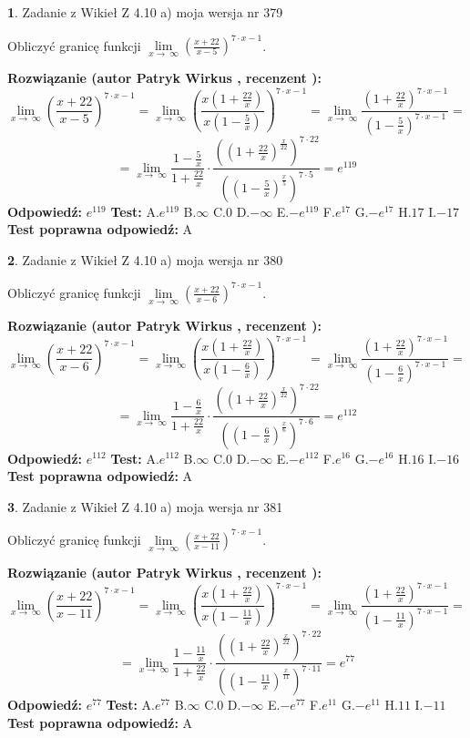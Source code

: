 \documentclass[12pt, a4paper]{article}
\theoremstyle{definition} %
\newtheorem{zad}{}
\newcommand{\zadStart}[1]{\begin{zad}#1\newline}
\newcommand{\zadStop}{\end{zad}}
\newcommand{\rozwStart}[2]{\noindent \textbf{Rozwiązanie (autor #1 , recenzent #2): }\newline}
\newcommand{\rozwStop}{\newline}
\newcommand{\odpStart}{\noindent \textbf{Odpowiedź:}\newline}
\newcommand{\odpStop}{\newline}
\newcommand{\testStart}{\noindent \textbf{Test:}\newline}
\newcommand{\testStop}{\newline}
\newcommand{\kluczStart}{\noindent \textbf{Test poprawna odpowiedź:}\newline}
\newcommand{\kluczStop}{\newline}
\begin{document}
\zadStart{Zadanie z Wikieł Z 4.10 a) moja wersja nr 379}

Obliczyć granicę funkcji  $\lim\limits_{x\to\ \infty}(\frac{x+22}{x-5})^{7\cdot x-1}$.
\zadStop
\rozwStart{Patryk Wirkus}{}
$$\lim\limits_{x\to\ \infty}(\frac{x+22}{x-5})^{7\cdot x-1} = \lim\limits_{x\to\ \infty}(\frac{x(1+\frac{22}{x})}{x(1-\frac{5}{x})})^{7\cdot x-1}=\lim\limits_{x\to\ \infty}\frac{(1+\frac{22}{x})^{7\cdot x-1}}{(1-\frac{5}{x})^{7\cdot x-1}}=$$
$$=\lim\limits_{x\to\ \infty}\frac{1-\frac{5}{x}}{1+\frac{22}{x}}\cdot\frac{((1+\frac{22}{x})^{\frac{x}{22}})^{7\cdot22}}{((1-\frac{5}{x})^{\frac{x}{5}})^{7\cdot5}}=e^{119}$$
\rozwStop
\odpStart
$e^{119}$
\odpStop
\testStart
A.$e^{119}$ B.$\infty$ C.$0$ D.$-\infty$ E.$-e^{119}$
F.$e^{17}$ G.$-e^{17}$
H.$17$
I.$-17$
\testStop
\kluczStart
A
\kluczStop



\zadStart{Zadanie z Wikieł Z 4.10 a) moja wersja nr 380}

Obliczyć granicę funkcji  $\lim\limits_{x\to\ \infty}(\frac{x+22}{x-6})^{7\cdot x-1}$.
\zadStop
\rozwStart{Patryk Wirkus}{}
$$\lim\limits_{x\to\ \infty}(\frac{x+22}{x-6})^{7\cdot x-1} = \lim\limits_{x\to\ \infty}(\frac{x(1+\frac{22}{x})}{x(1-\frac{6}{x})})^{7\cdot x-1}=\lim\limits_{x\to\ \infty}\frac{(1+\frac{22}{x})^{7\cdot x-1}}{(1-\frac{6}{x})^{7\cdot x-1}}=$$
$$=\lim\limits_{x\to\ \infty}\frac{1-\frac{6}{x}}{1+\frac{22}{x}}\cdot\frac{((1+\frac{22}{x})^{\frac{x}{22}})^{7\cdot22}}{((1-\frac{6}{x})^{\frac{x}{6}})^{7\cdot6}}=e^{112}$$
\rozwStop
\odpStart
$e^{112}$
\odpStop
\testStart
A.$e^{112}$ B.$\infty$ C.$0$ D.$-\infty$ E.$-e^{112}$
F.$e^{16}$ G.$-e^{16}$
H.$16$
I.$-16$
\testStop
\kluczStart
A
\kluczStop



\zadStart{Zadanie z Wikieł Z 4.10 a) moja wersja nr 381}

Obliczyć granicę funkcji  $\lim\limits_{x\to\ \infty}(\frac{x+22}{x-11})^{7\cdot x-1}$.
\zadStop
\rozwStart{Patryk Wirkus}{}
$$\lim\limits_{x\to\ \infty}(\frac{x+22}{x-11})^{7\cdot x-1} = \lim\limits_{x\to\ \infty}(\frac{x(1+\frac{22}{x})}{x(1-\frac{11}{x})})^{7\cdot x-1}=\lim\limits_{x\to\ \infty}\frac{(1+\frac{22}{x})^{7\cdot x-1}}{(1-\frac{11}{x})^{7\cdot x-1}}=$$
$$=\lim\limits_{x\to\ \infty}\frac{1-\frac{11}{x}}{1+\frac{22}{x}}\cdot\frac{((1+\frac{22}{x})^{\frac{x}{22}})^{7\cdot22}}{((1-\frac{11}{x})^{\frac{x}{11}})^{7\cdot11}}=e^{77}$$
\rozwStop
\odpStart
$e^{77}$
\odpStop
\testStart
A.$e^{77}$ B.$\infty$ C.$0$ D.$-\infty$ E.$-e^{77}$
F.$e^{11}$ G.$-e^{11}$
H.$11$
I.$-11$
\testStop
\kluczStart
A
\kluczStop
\end{document}
